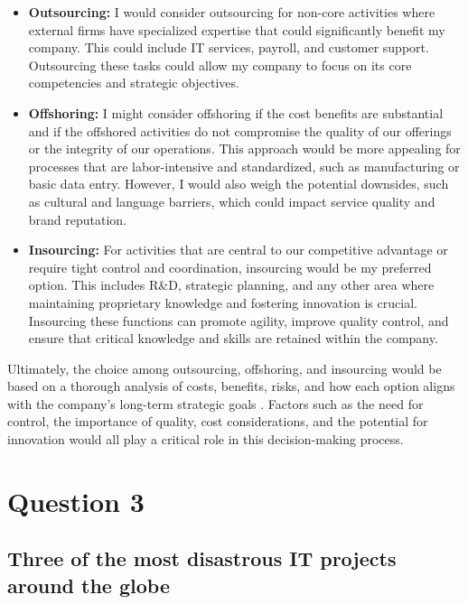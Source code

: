 \documentclass[12pt,a4paper]{article}
\begin{document}
\begin{itemize}
    \item \textbf{Outsourcing:} I would consider outsourcing for non-core activities where external firms have specialized expertise that could significantly benefit my company. This could include IT services, payroll, and customer support. Outsourcing these tasks could allow my company to focus on its core competencies and strategic objectives.
    \item \textbf{Offshoring:} I might consider offshoring if the cost benefits are substantial and if the offshored activities do not compromise the quality of our offerings or the integrity of our operations. This approach would be more appealing for processes that are labor-intensive and standardized, such as manufacturing or basic data entry. However, I would also weigh the potential downsides, such as cultural and language barriers, which could impact service quality and brand reputation.
    \item \textbf{Insourcing:} For activities that are central to our competitive advantage or require tight control and coordination, insourcing would be my preferred option. This includes R\&D, strategic planning, and any other area where maintaining proprietary knowledge and fostering innovation is crucial. Insourcing these functions can promote agility, improve quality control, and ensure that critical knowledge and skills are retained within the company.
\end{itemize}

\noindent Ultimately, the choice among outsourcing, offshoring, and insourcing would be based on a thorough analysis of costs, benefits, risks, and how each option aligns with the company's long-term strategic goals \citep{question_2.2}. Factors such as the need for control, the importance of quality, cost considerations, and the potential for innovation would all play a critical role in this decision-making process.


\pagebreak


\setcounter{page}{4}

\section{Question 3}
\subsection{Three of the most disastrous IT projects around the globe}
\label{sec:Question 3}
\nocite{question_3.1}
\end{document}
